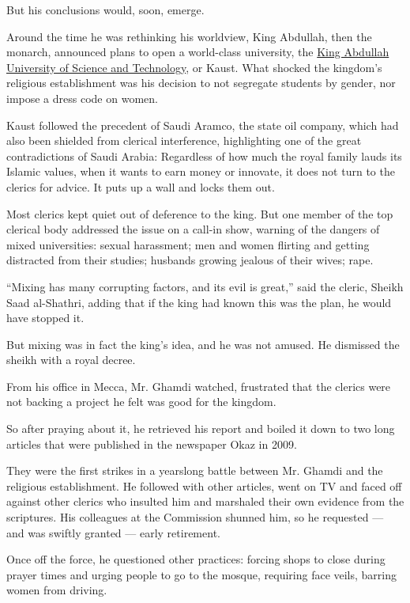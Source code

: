 But his conclusions would, soon, emerge.

Around the time he was rethinking his worldview, King Abdullah, then the
monarch, announced plans to open a world-class university, the
\href{https://www.kaust.edu.sa/en}{King Abdullah University of Science
and Technology}, or Kaust. What shocked the kingdom's religious
establishment was his decision to not segregate students by gender, nor
impose a dress code on women.

Kaust followed the precedent of Saudi Aramco, the state oil company,
which had also been shielded from clerical interference, highlighting
one of the great contradictions of Saudi Arabia: Regardless of how much
the royal family lauds its Islamic values, when it wants to earn money
or innovate, it does not turn to the clerics for advice. It puts up a
wall and locks them out.

Most clerics kept quiet out of deference to the king. But one member of
the top clerical body addressed the issue on a call-in show, warning of
the dangers of mixed universities: sexual harassment; men and women
flirting and getting distracted from their studies; husbands growing
jealous of their wives; rape.

``Mixing has many corrupting factors, and its evil is great,'' said the
cleric, Sheikh Saad al-Shathri, adding that if the king had known this
was the plan, he would have stopped it.

But mixing was in fact the king's idea, and he was not amused. He
dismissed the sheikh with a royal decree.

From his office in Mecca, Mr. Ghamdi watched, frustrated that the
clerics were not backing a project he felt was good for the kingdom.

So after praying about it, he retrieved his report and boiled it down to
two long articles that were published in the newspaper Okaz in 2009.

They were the first strikes in a yearslong battle between Mr. Ghamdi and
the religious establishment. He followed with other articles, went on TV
and faced off against other clerics who insulted him and marshaled their
own evidence from the scriptures. His colleagues at the Commission
shunned him, so he requested --- and was swiftly granted --- early
retirement.

Once off the force, he questioned other practices: forcing shops to
close during prayer times and urging people to go to the mosque,
requiring face veils, barring women from driving.

